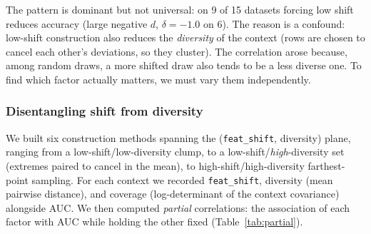 \documentclass{article}
\begin{document}
The pattern is dominant but not universal: on 9 of 15 datasets forcing low shift reduces accuracy (large negative $d$, $\delta=-1.0$ on 6). The reason is a confound: low-shift construction also reduces the \emph{diversity} of the context (rows are chosen to cancel each other's deviations, so they cluster). The correlation arose because, among random draws, a more shifted draw also tends to be a less diverse one. To find which factor actually matters, we must vary them independently.

\subsubsection*{Disentangling shift from diversity}

We built six construction methods spanning the (\texttt{feat\_shift}, diversity) plane, ranging from a low-shift/low-diversity clump, to a low-shift/\emph{high}-diversity set (extremes paired to cancel in the mean), to high-shift/high-diversity farthest-point sampling. For each context we recorded \texttt{feat\_shift}, diversity (mean pairwise distance), and coverage (log-determinant of the context covariance) alongside AUC. We then computed \emph{partial} correlations: the association of each factor with AUC while holding the other fixed (Table~\ref{tab:partial}).
\end{document}
